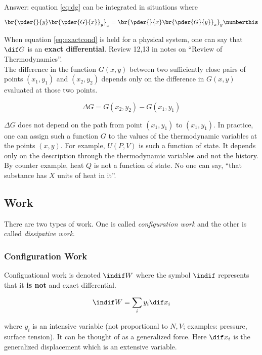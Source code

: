 \documentclass{article}
\begin{document}
Answer: equation \eqref{eq:dg} can be integrated in situations where

\[ \br{\pder{}{y}\br{\pder{G}{x}}_y}_x = \br{\pder{}{x}\br{\pder{G}{y}}_x}_y \numberthis \label{eq:exactcond}\]

When equation \eqref{eq:exactcond} is held for a physical system, one can say that $\dif G$ is an \textbf{exact differential}. Review 12,13 in notes on ``Review of Thermodynamics''. \\

The difference in the function $G(x,y)$ between two sufficiently close pairs of points $(x_1, y_1)$ and $(x_2, y_2)$ depends only on the difference in $G(x,y)$ evaluated at those two points.

\[ \Delta G = G(x_2, y_2) - G(x_1, y_1) \]

$\Delta G$ does not depend on the path from point $(x_1, y_1)$ to $(x_1, y_1)$. In practice, one can assign such a function $G$ to the values of the thermodynamic variables at the points $(x,y)$. For example, $U(P,V)$ is such a function of state. It depends only on the description through the thermodynamic variables and not the history. \\

By counter example, heat $Q$ is not a function of state. No one can say, ``that substance has $X$ units of heat in it''.

\subsection{Work}

There are two types of work. One is called \textit{configuration work} and the other is called \textit{dissipative work}. \\

\subsubsection{Configuration Work}

Configuational work is denoted $\indif W$ where the symbol $\indif$ represents that it \textbf{is not} and exact differential.

\[ \indif W = \sum_i y_i \dif x_i \]

where $y_i$ is an intensive variable (not proportional to $N, V$; examples: pressure, surface tension). It can be thought of as a generalized force. Here $\dif x_i$ is the generalized displacement which is an extensive variable.
\end{document}
